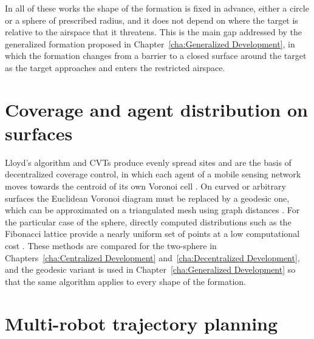 In all of these works the shape of the formation is fixed in advance, either a circle or a sphere of prescribed radius, and it does not depend on where the target is relative to the airspace that it threatens. This is the main gap addressed by the generalized formation proposed in Chapter~\ref{cha:Generalized Development}, in which the formation changes from a barrier to a closed surface around the target as the target approaches and enters the restricted airspace.

\section{Coverage and agent distribution on surfaces} \label{sec.2:Coverage on surfaces}

Lloyd's algorithm and \glspl{CVT} \cite{duCentroidalVoronoiTessellations1999} produce evenly spread sites and are the basis of decentralized coverage control, in which each agent of a mobile sensing network moves towards the centroid of its own Voronoi cell \cite{cortes2004}. On curved or arbitrary surfaces the Euclidean Voronoi diagram must be replaced by a geodesic one, which can be approximated on a triangulated mesh using graph distances \cite{mengEfficientAlgorithmApproximate2023}. For the particular case of the sphere, directly computed distributions such as the Fibonacci lattice provide a nearly uniform set of points at a low computational cost \cite{Latitude_Longitude_vs_fibonacci}. These methods are compared for the two-sphere in Chapters~\ref{cha:Centralized Development} and~\ref{cha:Decentralized Development}, and the geodesic variant is used in Chapter~\ref{cha:Generalized Development} so that the same algorithm applies to every shape of the formation.

\section{Multi-robot trajectory planning} \label{sec.2:Multi-robot trajectory planning}

